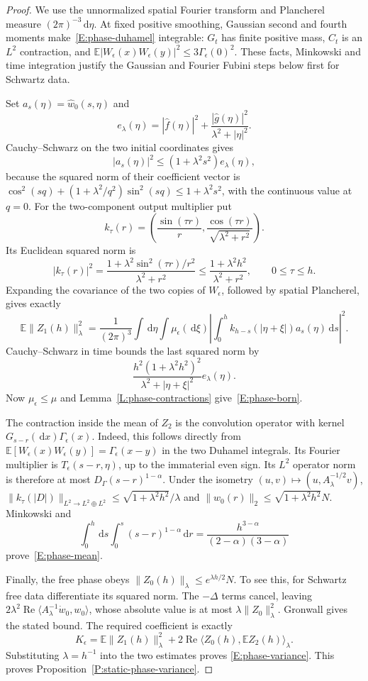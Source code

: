 \documentclass[12pt]{article}
\numberwithin{equation}{section}
\theoremstyle{definition}
\newcommand{\E}{\mathbb{E}}
\newcommand{\ud}{\,\mathrm{d}}
\begin{document}
\begin{proof}
  We use the unnormalized spatial Fourier transform and Plancherel
  measure $(2\pi)^{-3}\ud\eta$.
  At fixed positive smoothing, Gaussian second and fourth moments
  make~\eqref{E:phase-duhamel} integrable: $G_t$ has finite positive
  mass, $C_t$ is an $L^2$ contraction, and
  $\E|W_\epsilon(x)W_\epsilon(y)|^2
  \le3\Gamma_\epsilon(0)^2$.
  These facts, Minkowski and time integration justify the Gaussian
  and Fourier Fubini steps below first for Schwartz data.

  Set $a_s(\eta)=\widehat w_0(s,\eta)$ and
  \[
    e_\lambda(\eta)=|\widehat f(\eta)|^2+
    \frac{|\widehat g(\eta)|^2}{\lambda^2+|\eta|^2}.
  \]
  Cauchy--Schwarz on the two initial coordinates gives
  \[
    |a_s(\eta)|^2\le(1+\lambda^2s^2)e_\lambda(\eta),
  \]
  because the squared norm of their coefficient vector is
  $\cos^2(sq)+(1+\lambda^2/q^2)\sin^2(sq)
  \le1+\lambda^2s^2$, with the continuous value at $q=0$.
  For the two-component output multiplier put
  \[
    k_\tau(r)=\left(\frac{\sin(\tau r)}r,
    \frac{\cos(\tau r)}{\sqrt{\lambda^2+r^2}}\right).
  \]
  Its Euclidean squared norm is
  \[
    |k_\tau(r)|^2
    =\frac{1+\lambda^2\sin^2(\tau r)/r^2}{\lambda^2+r^2}
    \le\frac{1+\lambda^2h^2}{\lambda^2+r^2},\qquad 0\le\tau\le h.
  \]
  Expanding the covariance of the two copies of $W_\epsilon$,
  followed by spatial Plancherel, gives exactly
  \[
    \E\|Z_1(h)\|_\lambda^2
    =\frac1{(2\pi)^3}\int\ud\eta\int\mu_\epsilon(\ud\xi)
    \left|\int_0^h k_{h-s}(|\eta+\xi|)a_s(\eta)\ud s\right|^2.
  \]
  Cauchy--Schwarz in time bounds the last squared norm by
  \[
    \frac{h^2(1+\lambda^2h^2)^2}
    {\lambda^2+|\eta+\xi|^2}e_\lambda(\eta).
  \]
  Now $\mu_\epsilon\le\mu$ and
  Lemma~\ref{L:phase-contractions} give~\eqref{E:phase-born}.

  The contraction inside the mean of $Z_2$ is the convolution
  operator with kernel $G_{s-r}(\ud x)\Gamma_\epsilon(x)$.
  Indeed, this follows directly from
  $\E[W_\epsilon(x)W_\epsilon(y)]=\Gamma_\epsilon(x-y)$
  in the two Duhamel integrals. Its Fourier multiplier is
  $T_\epsilon(s-r,\eta)$, up to the immaterial even sign.
  Its $L^2$ operator norm is therefore at most
  $D_\Gamma(s-r)^{1-\alpha}$.
  Under the isometry $(u,v)\mapsto(u,A_\lambda^{-1/2}v)$,
  $\|k_\tau(|D|)\|_{L^2\to L^2\oplus L^2}
  \le\sqrt{1+\lambda^2h^2}/\lambda$ and
  $\|w_0(r)\|_2\le\sqrt{1+\lambda^2h^2}N$.
  Minkowski and
  \[
    \int_0^h\ud s\int_0^s(s-r)^{1-\alpha}\ud r
    =\frac{h^{3-\alpha}}{(2-\alpha)(3-\alpha)}
  \]
  prove~\eqref{E:phase-mean}.

  Finally, the free phase obeys
  $\|Z_0(h)\|_\lambda\le e^{\lambda h/2}N$.
  To see this, for Schwartz free data differentiate its squared norm.
  The $-\Delta$ terms cancel, leaving
  $2\lambda^2\operatorname{Re}\langle A_\lambda^{-1}\dot w_0,w_0\rangle$,
  whose absolute value is at most $\lambda\|Z_0\|_\lambda^2$.
  Gronwall gives the stated bound. The required coefficient is exactly
  \[
    K_\epsilon=\E\|Z_1(h)\|_\lambda^2+
    2\operatorname{Re}\langle Z_0(h),\E Z_2(h)\rangle_\lambda.
  \]
  Substituting $\lambda=h^{-1}$ into the two estimates proves
  \eqref{E:phase-variance}. This proves
  Proposition~\ref{P:static-phase-variance}.
\end{proof}
\end{document}
